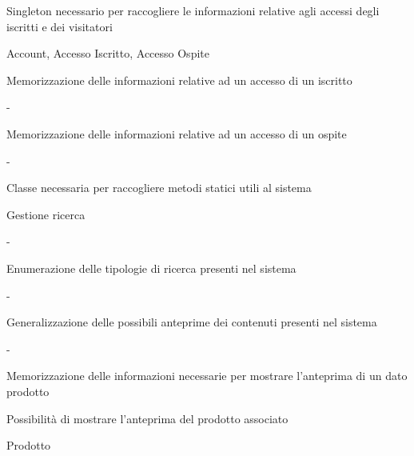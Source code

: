 {\begin{itemWork}
	\item Singleton necessario per raccogliere le informazioni relative agli accessi degli iscritti e dei visitatori
\end{itemWork}}
{\begin{itemWork}
	\item Account, Accesso Iscritto, Accesso Ospite
\end{itemWork}}



{\begin{itemWork}
	\item Memorizzazione delle informazioni relative ad un accesso di un iscritto
\end{itemWork}}
{-}



{\begin{itemWork}
	\item Memorizzazione delle informazioni relative ad un accesso di un ospite
\end{itemWork}}
{-}


{\begin{itemWork}
	\item Classe necessaria per raccogliere metodi statici utili al sistema
	\item Gestione ricerca
\end{itemWork}}
{-}


{\begin{itemWork}
	\item Enumerazione delle tipologie di ricerca presenti nel sistema
\end{itemWork}}
{-}


{\begin{itemWork}
	\item Generalizzazione delle possibili anteprime dei contenuti presenti nel sistema
\end{itemWork}}
{-}


{\begin{itemWork}
	\item Memorizzazione delle informazioni necessarie per mostrare l'anteprima di un dato prodotto
	\item Possibilità di mostrare l'anteprima del prodotto associato
\end{itemWork}}
{\begin{itemWork}
	\item Prodotto
\end{itemWork}}

